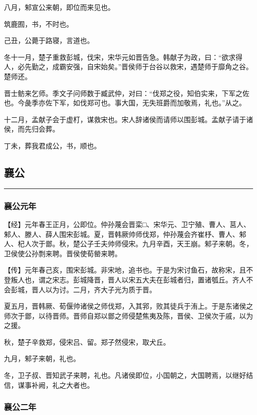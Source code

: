 \documentclass[]{article}
\begin{document}
八月，邾宣公来朝，即位而来见也。

筑鹿囿，书，不时也。

己丑，公薨于路寝，言道也。

冬十一月，楚子重救彭城，伐宋，宋华元如晋告急。韩献子为政，曰：``欲求得人，必先勤之，成霸安强，自宋始矣。''晋侯师于台谷以救宋，遇楚师于靡角之谷。楚师还。

晋士鲂来乞师。季文子问师数于臧武仲，对曰：``伐郑之役，知伯实来，下军之佐也。今彘季亦佐下军，如伐郑可也。事大国，无失班爵而加敬焉，礼也。''从之。

十二月，孟献子会于虚朾，谋救宋也。宋人辞诸侯而请师以围彭城。孟献子请于诸侯，而先归会葬。

丁未，葬我君成公，书，顺也。

\hypertarget{header-n1807}{%
\subsection{襄公}\label{header-n1807}}

\begin{center}\rule{0.5\linewidth}{\linethickness}\end{center}

\hypertarget{header-n1809}{%
\subsubsection{襄公元年}\label{header-n1809}}

【经】元年春王正月，公即位。仲孙蔑会晋栾□、宋华元、卫宁殖、曹人、莒人、邾人、滕人、薛人围宋彭城。夏，晋韩厥帅师伐郑，仲孙蔑会齐崔杼、曹人、邾人、杞人次于鄫。秋，楚公子壬夫帅师侵宋。九月辛酉，天王崩。邾子来朝。冬，卫侯使公孙剽来聘。晋侯使荀罃来聘。

【传】元年春己亥，围宋彭城。非宋地，追书也。于是为宋讨鱼石，故称宋，且不登叛人也，谓之宋志。彭城降晋，晋人以宋五大夫在彭城者归，置诸瓠丘。齐人不会彭城，晋人以为讨。二月，齐大子光为质于晋。

夏五月，晋韩厥、荀偃帅诸侯之师伐郑，入其郛，败其徒兵于洧上。于是东诸侯之师次于鄫，以待晋师。晋师自郑以鄫之师侵楚焦夷及陈，晋侯、卫侯次于戚，以为之援。

秋，楚子辛救郑，侵宋吕、留。郑子然侵宋，取犬丘。

九月，邾子来朝，礼也。

冬，卫子叔、晋知武子来聘，礼也。凡诸侯即位，小国朝之，大国聘焉，以继好结信，谋事补阙，礼之大者也。

\hypertarget{header-n1818}{%
\subsubsection{襄公二年}\label{header-n1818}}
\end{document}
